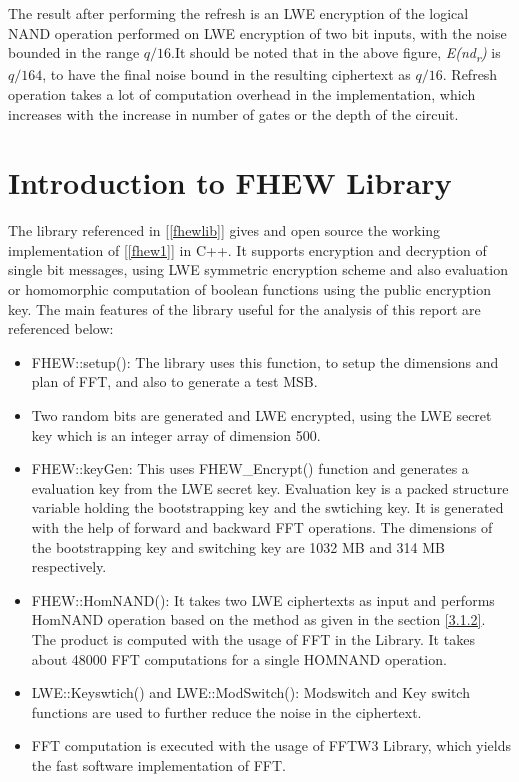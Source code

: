 

\noindent The result after performing the refresh is an LWE encryption of the logical NAND operation performed on LWE encryption of two bit inputs, with the noise bounded in the range $q/16$.It should be noted that in the above figure, \textit{E(nd\textsubscript{r})} is $q/164$, to have the final noise bound in the resulting ciphertext as $q/16$. Refresh operation takes a lot of computation overhead in the implementation, which increases with the increase in number of gates or the depth of the circuit.


\section{Introduction to FHEW Library} \label{3.2}
The library referenced  in [\ref{fhewlib}] gives and open source the working implementation of [\ref{fhew1}] in C++. It supports encryption and decryption of single bit messages, using LWE symmetric encryption scheme and also evaluation or homomorphic computation of boolean functions using the public encryption key. The main features of the library useful for the analysis of this report are referenced below:
\begin{itemize}
\item
FHEW::setup(): The library uses this function, to setup the dimensions and plan of FFT, and also to generate a test MSB. 
\item
Two random bits are generated and LWE encrypted, using the LWE secret key which is an integer array of dimension 500.
\item
FHEW::keyGen: This uses FHEW\_Encrypt() function and generates a evaluation key from the LWE secret key. Evaluation key is a packed structure variable holding the bootstrapping key and the swtiching key. It is generated with the help of forward and backward FFT operations. The dimensions of the bootstrapping key and switching key are 1032 MB and 314 MB respectively.
\item
FHEW::HomNAND(): It takes two LWE ciphertexts as input and performs HomNAND operation based on the method as given in the section \ref{3.1.2}. The product is computed with the usage of FFT in the Library. It takes about 48000 FFT computations for a single HOMNAND operation.
\item
LWE::Keyswtich() and  LWE::ModSwitch(): Modswitch and Key switch functions are used to further reduce the noise in the ciphertext.
\item
FFT computation is executed with the usage of FFTW3 Library, which yields the fast software implementation of FFT.
\end{itemize}

